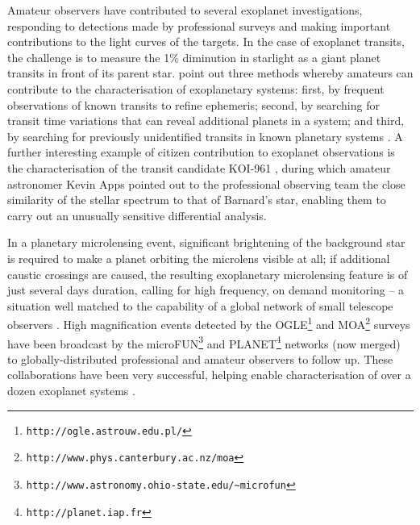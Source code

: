 \documentclass{ar2e}
\def\CaseStudy#1{\noindent{\it\bf #1 \,\,\,\,}}
\def\url#1{\texttt{#1}}
\begin{document}
\CaseStudy{Transiting and Microlensing Exoplanets.}  
Amateur observers have contributed to several exoplanet investigations,
responding to detections made by professional surveys and making important
contributions to the light curves of the targets. In the case of exoplanet
transits, the challenge is to measure the 1\% diminution in starlight as a giant
planet transits in front of its parent star. \citet{14mousis_proam} point out three
methods whereby amateurs can contribute to the characterisation of exoplanetary
systems: first, by frequent observations of known transits to refine ephemeris;
second, by searching for transit time variations that can reveal additional
planets in a system; and third, by searching for previously unidentified
transits in known planetary systems \citep[e.g., the discovery of the transit of
HD 80606b from a 30 cm telescope near London,][]{09fossey}. 
A further interesting example of citizen contribution to exoplanet observations
is the characterisation of the transit candidate KOI-961 \citep{Muirhead2012}, 
during which amateur astronomer Kevin Apps pointed out to 
the professional observing 
team the close similarity of the stellar spectrum to that of Barnard's star,
enabling them to carry out an unusually sensitive differential analysis. 

In a planetary
microlensing event, significant brightening of the background star is required
to make a planet orbiting the microlens visible at all; if additional caustic
crossings are caused, the resulting exoplanetary microlensing feature is of just
several days duration, calling for high frequency, on demand monitoring -- a
situation well matched to the capability of a global network of small telescope
observers \citep[see e.g.\ ][]{Christie2006}. High magnification events
detected by the  OGLE\footnote{\url{http://ogle.astrouw.edu.pl/}} and
MOA\footnote{\url{http://www.phys.canterbury.ac.nz/moa}} surveys have been
broadcast by the
microFUN\footnote{\url{http://www.astronomy.ohio-state.edu/\textasciitilde microfun}} and
PLANET\footnote{\url{http://planet.iap.fr}} networks (now merged) to
globally-distributed professional and amateur observers to follow up. These
collaborations have been very successful, helping enable characterisation of
over a dozen exoplanet systems \citep[see e.g.\ ][and references
therein]{Udalski++2005,Gould++2014}.


% 
% 
\end{document}
